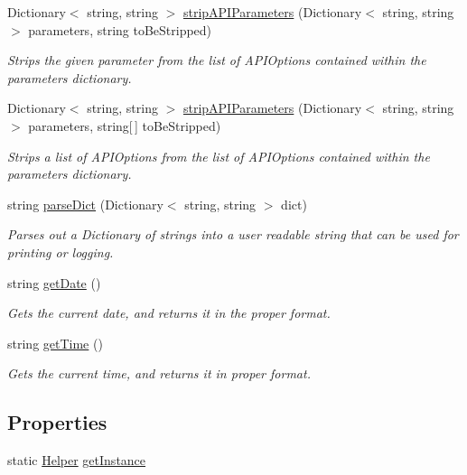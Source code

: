 \begin{DoxyCompactItemize}
\item 
Dictionary$<$ string, string $>$ \mbox{\hyperlink{class_form_sim_1_1_helper_a78ee613f626109557d9ee517de730d45}{strip\+A\+P\+I\+Parameters}} (Dictionary$<$ string, string $>$ parameters, string to\+Be\+Stripped)
\begin{DoxyCompactList}\small\item\em Strips the given parameter from the list of A\+P\+I\+Options contained within the parameters dictionary. \end{DoxyCompactList}\item 
Dictionary$<$ string, string $>$ \mbox{\hyperlink{class_form_sim_1_1_helper_a8a6a59356795949c64f587e9f39037f7}{strip\+A\+P\+I\+Parameters}} (Dictionary$<$ string, string $>$ parameters, string\mbox{[}$\,$\mbox{]} to\+Be\+Stripped)
\begin{DoxyCompactList}\small\item\em Strips a list of A\+P\+I\+Options from the list of A\+P\+I\+Options contained within the parameters dictionary. \end{DoxyCompactList}\item 
string \mbox{\hyperlink{class_form_sim_1_1_helper_a1f47101e1905473c2cfb068029be26a4}{parse\+Dict}} (Dictionary$<$ string, string $>$ dict)
\begin{DoxyCompactList}\small\item\em Parses out a Dictionary of strings into a user readable string that can be used for printing or logging. \end{DoxyCompactList}\item 
string \mbox{\hyperlink{class_form_sim_1_1_helper_a3968424b9dab262dce2c066807926c77}{get\+Date}} ()
\begin{DoxyCompactList}\small\item\em Gets the current date, and returns it in the proper format. \end{DoxyCompactList}\item 
string \mbox{\hyperlink{class_form_sim_1_1_helper_a1bfb27c73d68bbcd7224e5f041ba3606}{get\+Time}} ()
\begin{DoxyCompactList}\small\item\em Gets the current time, and returns it in proper format. \end{DoxyCompactList}\end{DoxyCompactItemize}
\subsection*{Properties}
\begin{DoxyCompactItemize}
\item 
static \mbox{\hyperlink{class_form_sim_1_1_helper}{Helper}} \mbox{\hyperlink{class_form_sim_1_1_helper_ac61d1dca7ce9b1fa7e4ce17e99b0b7e1}{get\+Instance}}
\end{DoxyCompactItemize}
